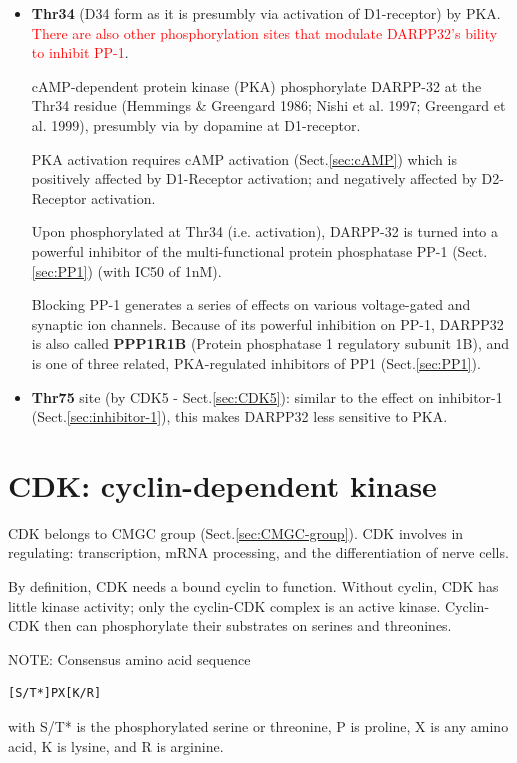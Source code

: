 \begin{itemize}
  \item {\bf Thr34} (D34 form as it is presumbly via activation of D1-receptor)
  by PKA. \textcolor{red}{There are also other phosphorylation sites that
  modulate DARPP32's bility to inhibit PP-1}.
  
  cAMP-dependent protein kinase (PKA) phosphorylate DARPP-32 at the Thr34
  residue (Hemmings \& Greengard 1986; Nishi et al. 1997; Greengard et al.
  1999), presumbly via by dopamine at D1-receptor.

PKA activation requires cAMP activation (Sect.\ref{sec:cAMP}) which is
positively affected by D1-Receptor activation; and negatively affected by
D2-Receptor activation.

Upon phosphorylated at Thr34 (i.e. activation), DARPP-32 is turned into a
powerful inhibitor of the multi-functional protein phosphatase PP-1
(Sect.\ref{sec:PP1}) (with IC50 of 1nM).

Blocking PP-1 generates a series of effects on various voltage-gated and
synaptic ion channels. Because of its powerful inhibition on PP-1, DARPP32 is
also called {\bf PPP1R1B} (Protein phosphatase 1 regulatory subunit 1B), and is
one of three related, PKA-regulated inhibitors of PP1 (Sect.\ref{sec:PP1}).

  \item {\bf Thr75} site (by CDK5 - Sect.\ref{sec:CDK5}): similar to the effect
  on inhibitor-1 (Sect.\ref{sec:inhibitor-1}), this makes DARPP32 less sensitive
  to PKA.

\end{itemize}


\section{CDK: cyclin-dependent kinase}
\label{sec:CDK}

CDK belongs to CMGC group (Sect.\ref{sec:CMGC-group}). CDK involves in
regulating:  transcription, mRNA processing, and the differentiation of nerve
cells.

By definition, CDK needs a bound cyclin to function.
Without cyclin, CDK has little kinase activity; only the cyclin-CDK complex is
an active kinase. Cyclin-CDK then can phosphorylate their substrates on serines
and threonines.

NOTE: Consensus amino acid sequence
\begin{verbatim}
[S/T*]PX[K/R]
\end{verbatim}
with S/T* is the phosphorylated serine or threonine, P is proline, X is any
amino acid, K is lysine, and R is arginine.

